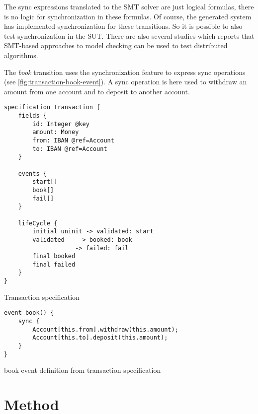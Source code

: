 The sync expressions translated to the SMT solver are just logical formulas,
there is no logic for synchronization in these formulas. Of course, the generated system has
implemented synchronization for these transitions. So it is possible to also
test synchronization in the SUT. There are also several studies which reports
that SMT-based approaches to model checking can be used to test distributed
algorithms.~\cite{konnov2015you, alberti2015smt}


The \textit{book} transition uses the synchronization feature to express sync
operations (see \autoref{fig:transaction-book-event}). A sync operation is here
used to withdraw an amount from one account and to deposit to another account.


\begin{sourcecode}[h!]
\begin{lstlisting}[]
specification Transaction {
	fields {
		id: Integer @key
		amount: Money
		from: IBAN @ref=Account
		to: IBAN @ref=Account
	}

	events {
		start[]
		book[]
		fail[]
	}

	lifeCycle {
		initial uninit -> validated: start
		validated    -> booked: book
					-> failed: fail
		final booked
		final failed
	}
}
\end{lstlisting}
\caption{Transaction specification}
\label{fig:transaction-spec}
\end{sourcecode}

\begin{sourcecode}[h!]
\begin{lstlisting}[]
event book() {
	sync {
		Account[this.from].withdraw(this.amount);
		Account[this.to].deposit(this.amount);
	}
}
\end{lstlisting}
\caption{book event definition from transaction specification}
\label{fig:transaction-book-event}
\end{sourcecode}

\section{Method}

